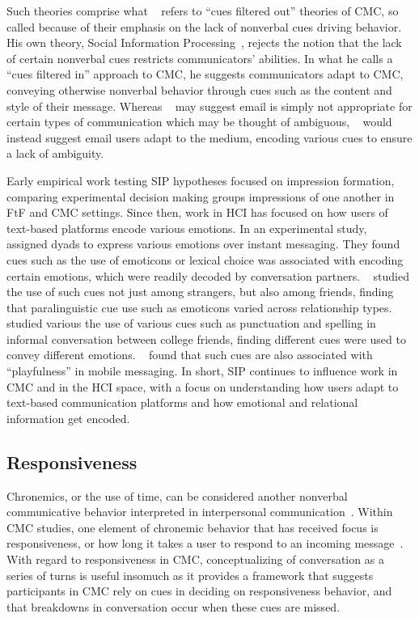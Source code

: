 \documentclass[12pt]{nuthesis}	%
\begin{document}
Such theories comprise what ~\citet{walther2002cues} refers to ``cues filtered out'' theories of CMC, so called because of their emphasis on the lack of nonverbal cues driving behavior. His own theory, Social Information Processing~\citep{walther1992interpersonal}, rejects the notion that the lack of certain nonverbal cues restricts communicators' abilities. In what he calls a ``cues filtered in'' approach to CMC, he suggests communicators adapt to CMC, conveying otherwise nonverbal behavior through cues such as the content and style of their message. Whereas ~\citet{daft1986organizational} may suggest email is simply not appropriate for certain types of communication which may be thought of ambiguous, ~\citet{walther1992interpersonal} would instead suggest email users adapt to the medium, encoding various cues to ensure a lack of ambiguity.

Early empirical work testing SIP hypotheses focused on impression formation, comparing experimental decision making groups impressions of one another in FtF and CMC settings. Since then, work in HCI has focused on how users of text-based platforms encode various emotions. In an experimental study, ~\citet{hancock2007expressing} assigned dyads to express various emotions over instant messaging. They found cues such as the use of emoticons or lexical choice was associated with encoding certain emotions, which were readily decoded by conversation partners. ~\citet{derks2008emoticons} studied the use of such cues not just among strangers, but also among friends, finding that paralinguistic cue use such as emoticons varied across relationship types. ~\citet{pirzadeh2014you} studied various the use of various cues such as punctuation and spelling in informal conversation between college friends, finding different cues were used to convey different emotions. ~\citet{hsieh2017playfulness} found that such cues are also associated with ``playfulness'' in mobile messaging. In short, SIP continues to influence work in CMC and in the HCI space, with a focus on understanding how users adapt to text-based communication platforms and how emotional and relational information get encoded.

\subsection{Responsiveness}

Chronemics, or the use of time, can be considered another nonverbal communicative behavior interpreted in interpersonal communication~\citep{burgoon2016nonverbal}. Within CMC studies, one element of chronemic behavior that has received focus is responsiveness, or how long it takes a user to respond to an incoming message~\citep[e.g.][]{heston2017worth,kalman2006pauses,kalman2011online}. With regard to responsiveness in CMC, conceptualizing of conversation as a series of turns is useful insomuch as it provides a framework that suggests participants in CMC rely on cues in deciding on responsiveness behavior, and that breakdowns in conversation occur when these cues are missed.
\end{document}
